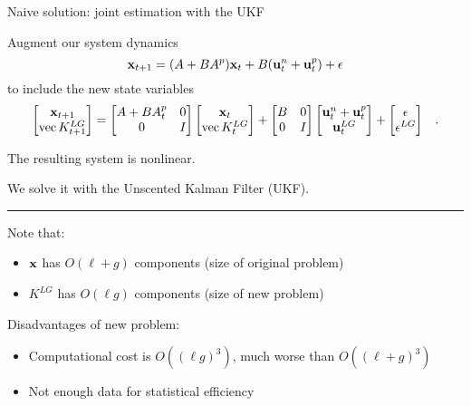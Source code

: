 \begin{frame}{Naive solution: joint estimation with the UKF}

Augment our system dynamics
\begin{equation*}
\mathbf{x}_{t+1} = (A+BA^p)\mathbf{x}_t + B(\mathbf{u}_t^n+\mathbf{u}_t^p) + \epsilon
\end{equation*}
to include the new state variables
\begin{equation*}
\label{eq:aug}
\begin{aligned}
\begin{split}
\begin{bmatrix}
\mathbf{x}_{t+1} \\
\operatorname*{vec} K^{LG}_{t+1}
\end{bmatrix}
&=
\begin{bmatrix}
A + BA^p_t & 0 \\
0 & I
\end{bmatrix}
\begin{bmatrix}
\mathbf{x}_t \\
\operatorname*{vec} K^{LG}_t
\end{bmatrix}
+
\begin{bmatrix}
B & 0\\
0 & I
\end{bmatrix}
\begin{bmatrix}
\mathbf{u}_t^n + \mathbf{u}_t^p \\
\mathbf{u}^{LG}_t
\end{bmatrix}
+
\begin{bmatrix}
\epsilon \\
\epsilon^{LG}
\end{bmatrix}
\end{split}
.
\end{aligned}
\end{equation*}

The resulting system is nonlinear.

We solve it with the Unscented Kalman Filter (UKF).

\noindent\rule[0.5ex]{\linewidth}{1pt}
\pause

Note that:
\begin{itemize}
\item $\mathbf{x}$ has $O(\ell+g)$ components (size of original problem)
\item $K^{LG}$ has $O(\ell g)$ components (size of new problem)
\end{itemize}

\pause
Disadvantages of new problem:
\begin{itemize}
\item Computational cost is $O((\ell g)^3)$, much worse than $O((\ell+g)^3)$
\item Not enough data for statistical efficiency
\end{itemize}
\end{frame}

